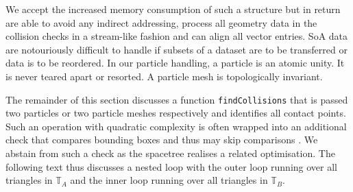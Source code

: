 We accept the increased memory consumption of such a structure but in return are
able to avoid any indirect addressing, process all geometry data in the
collision checks in a stream-like fashion and can align all vector entries. 
SoA data are notouriously difficult to handle if subsets of a dataset are to be
transferred or data is to be reordered.
In our particle handling, a particle is an atomic unity.
It is never teared apart or resorted.
A particle mesh is topologically invariant.


The remainder of this section discusses a function \texttt{findCollisions} that
is passed two particles or two particle meshes respectively and identifies all
contact points. 
Such an operation with quadratic complexity is often wrapped into an additional
check that compares bounding boxes and thus may skip comparisons
\cite{mattutis}.
We abstain from such a check as the spacetree realises a related optimisation.
The following text thus discusses a nested loop with the outer loop
running over all triangles in $\mathbb{T}_A$ and the inner loop running over all
triangles in $\mathbb{T}_B$. 





